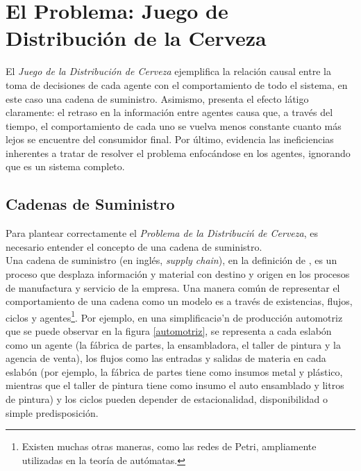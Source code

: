 \chapter{El Problema: Juego de Distribuci\'on de la Cerveza}

El \textit{Juego de la Distribución de Cerveza} ejemplifica la relaci\'on causal entre la toma de decisiones de cada agente con el comportamiento de todo el sistema, en este caso una cadena de suministro. Asimismo, presenta el efecto l\'atigo claramente: el retraso en la informaci\'on entre agentes causa que, a trav\'es del tiempo, el comportamiento de cada uno se vuelva menos constante cuanto m\'as lejos se encuentre del consumidor final. Por \'ultimo, evidencia las ineficiencias inherentes a tratar de resolver el problema enfoc\'andose en los agentes, ignorando que es un sistema completo. 




\section{Cadenas de Suministro}

Para plantear correctamente el \textit{Problema de la Distribuci\'n de Cerveza}, es necesario entender el concepto de una cadena de suministro. \\

Una cadena de suministro (en ingl\'es, \textit{supply chain}), en la definici\'on de \citet{Jacobs},  es un proceso que desplaza informaci\'on y material con destino y origen en los procesos de manufactura y servicio de la empresa. Una manera com\'un de representar el comportamiento de una cadena como un modelo es a trav\'es de existencias, flujos, ciclos y agentes\footnote{Existen muchas otras maneras, como las redes de Petri, ampliamente utilizadas en la teor\'ia de aut\'omatas.}. Por ejemplo, en una simplificaci\o'n de producci\'on automotriz que se puede observar en la figura \ref{automotriz}, se representa a cada eslab\'on como un agente (la f\'abrica de partes, la ensambladora, el taller de pintura y la agencia de venta), los flujos como las entradas y salidas de materia en cada eslab\'on (por ejemplo, la f\'abrica de partes tiene como insumos metal y pl\'astico, mientras que el taller de pintura tiene como insumo el auto ensamblado y litros de pintura) y los ciclos pueden depender de estacionalidad, disponibilidad o simple predisposici\'on.\\

